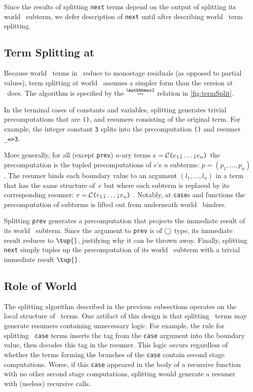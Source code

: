 \begin{abstrsyn}
Since the results of splitting \texttt{next} terms depend on the output of
splitting its world \bbtwo\ subterm,
we defer description of \texttt{next} until after describing world \bbtwo\ term splitting.

\subsection{Term Splitting at \bbtwo}

Because world \bbtwo\ terms in \lang\ reduce to monostage residuals (as opposed to partial values),
term splitting at world \bbtwo\ assumes a simpler form than the version at \bbonem\ does. 
The algorithm is specified by the $\splittwosym$ relation in \cref{fig:termSplit}.

In the terminal cases of
constants and variables, splitting generates trivial precomputations that are \texttt{()}, and resumers consisting of the original term.
For example, the integer constant \texttt{3} splits into the
precomputation \texttt{()} and resumer \texttt{\_=>3}.

More generally, for all (except \texttt{prev}) 
$n$-ary terms $e = \mathcal{C}\texttt{(} e_1 \texttt{;} \ldots \texttt{;} e_n \texttt{)}$ 
the precomputation is the tupled precomputations of $e$'s $n$ subterms:
$p=(p_1,\ldots,p_n)$.  The resumer binds each boundary value to an
argument $(l_1,\ldots,l_n)$ in a term that has the same structure
of~$e$ but where each subterm is replaced by its corresponding resumer:
$r = \mathcal{C}\texttt{(} r_1 \texttt{;} \ldots \texttt{;} r_n \texttt{)}$ .
Notably, at \texttt{case}s and functions the
precomputation of subterms is lifted out from underneath world \bbtwo\ binders.  

Splitting \texttt{prev} generates a precomputation that projects the immediate
result of its world \bbone\ subterm.
Since the argument to \texttt{prev} is of $\bigcirc$ type, its immediate result reduces to $\tup{}$, justifying why it can be thrown away.
Finally, splitting \texttt{next} simply tuples up the precomputation of its
world \bbtwo\ subterm with a trivial immediate result $\tup{}$.

\subsection {Role of World \bbonep}
\label{sec:needGround}

The splitting algorithm described in the previous subsections operates
on the local structure of \lang\ terms.  One artifact of this design
is that splitting \bbonem\ terms may generate resumers containing
unnecessary logic.  For example, the rule for splitting
\bbonem\ \texttt{case} terms inserts the tag from the \texttt{case}
argument into the boundary value, then decodes this tag in the
resumer. This logic occurs regardless of whether the terms forming the
branches of the \texttt{case} contain second stage computations.
Worse, if this \texttt{case} appeared in the body of a recursive
function with no other second stage computations, splitting would
generate a resumer with (useless) recursive calls.


\end{abstrsyn}
